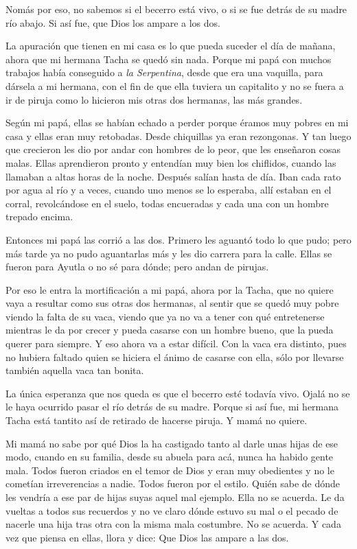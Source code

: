 \begin{pages}
\begin{Leftside}
		\pstart
			Nomás por eso, no sabemos si el becerro está vivo, o si se fue detrás de su madre
			río abajo. Si así fue, que Dios los ampare a los dos.
		\pend

		\pstart
			La apuración que tienen en mi casa es lo que pueda suceder el día de mañana, ahora que mi hermana Tacha se quedó sin nada. Porque mi papá con muchos trabajos había conseguido a \textit{la Serpentina}, desde que era una vaquilla, para dársela a mi hermana, con el fin de que ella tuviera un capitalito y no se fuera a ir de piruja como lo hicieron mis otras dos hermanas, las más grandes.
		\pend

		\pstart
			Según mi papá, ellas se habían echado a perder porque éramos muy pobres en mi casa y ellas eran muy retobadas. Desde chiquillas ya eran rezongonas. Y tan luego que crecieron les dio por andar con hombres de lo peor, que les enseñaron cosas malas. Ellas aprendieron pronto y entendían muy bien los chiflidos, cuando las llamaban a altas horas de la noche. Después salían hasta de día. Iban cada rato por agua al río y a veces, cuando uno menos se lo esperaba, allí estaban en el corral, revolcándose en el suelo, todas encueradas y cada una con un hombre trepado encima.
		\pend

		\pstart
			Entonces mi papá las corrió a las dos. Primero les aguantó todo lo que pudo; pero más tarde ya no pudo aguantarlas más y les dio carrera para la calle. Ellas se fueron para Ayutla o no sé para dónde; pero andan de pirujas.
		\pend

		\pstart
			Por eso le entra la mortificación a mi papá, ahora por la Tacha, que no quiere vaya a resultar como sus otras dos hermanas, al sentir que se quedó muy pobre viendo la falta de su vaca, viendo que ya no va a tener con qué entretenerse mientras le da por crecer y pueda casarse con un hombre bueno, que la pueda querer para siempre. Y eso ahora va a estar difícil. Con la vaca era distinto, pues no hubiera faltado quien se hiciera el ánimo de casarse con ella, sólo por llevarse también aquella vaca tan bonita.
		\pend

		\pstart
			La única esperanza que nos queda es que el becerro esté todavía vivo. Ojalá no se le haya ocurrido pasar el río detrás de su madre. Porque si así fue, mi hermana Tacha está tantito así de retirado de hacerse piruja. Y mamá no quiere.

		\pend

		\pstart
			Mi mamá no sabe por qué Dios la ha castigado tanto al darle unas hijas de ese modo, cuando en su familia, desde su abuela para acá, nunca ha habido gente mala. Todos fueron criados en el temor de Dios y eran muy obedientes y no le cometían irreverencias a nadie. Todos fueron por el estilo. Quién sabe de dónde les vendría a ese par de hijas suyas aquel mal ejemplo. Ella no se acuerda. Le da vueltas a todos sus recuerdos y no ve claro dónde estuvo su mal o el pecado de nacerle una hija tras otra con la misma mala costumbre. No se acuerda. Y cada vez que piensa en ellas, llora y dice: \og{}Que Dios las ampare a las dos.\fg{}


\end{Leftside}
\end{pages}
